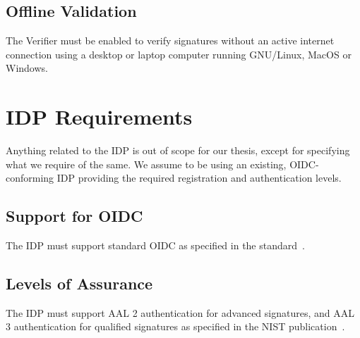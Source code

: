 \subsection{Offline Validation}
The Verifier must be enabled to verify signatures without an active internet connection using a desktop or laptop computer running GNU/Linux, MacOS or Windows.

\section{IDP Requirements}
Anything related to the \gls{IDP} is out of scope for our thesis, except for specifying what we require of the same.
We assume to be using an existing, \gls{OIDC}-conforming \gls{IDP} providing the required registration and authentication levels.

\subsection{Support for OIDC}
The \gls{IDP} must support standard \gls{OIDC} as specified in the standard~\cite{oidc}.


\subsection{Levels of Assurance}
The \gls{IDP} must support \gls{AAL} 2 authentication for advanced signatures, and \gls{AAL} 3 authentication for qualified signatures as specified in the \gls{NIST} publication~\cite{nistdigitalidentityguidelines}.

